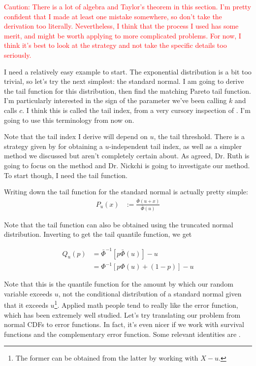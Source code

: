 \documentclass{article}
\begin{document}
\textcolor{red}{Caution: There is a lot of algebra and Taylor's theorem in this section. I'm pretty confident that I made at least one mistake somewhere, so don't take the derivation too literally. Nevertheless, I think that the process I used has some merit, and might be worth applying to more complicated problems. For now, I think it's best to look at the strategy and not take the specific details too seriously.}

I need a relatively easy example to start. The exponential distribution is a bit too trivial, so let's try the next simplest: the standard normal. I am going to derive the tail function for this distribution, then find the matching Pareto tail function. I'm particularly interested in the sign of the parameter we've been calling $k$ and \citeauthor{Pic75} calls $c$. I think this is called the tail index, from a very cursory inspection of \citet{deH06}. I'm going to use this terminology from now on.

Note that the tail index I derive will depend on $u$, the tail threshold. There is a strategy given by \citeauthor{Pic75} for obtaining a $u$-independent tail index, as well as a simpler method we discussed but aren't completely certain about. As agreed, Dr. Ruth is going to focus on the \citeauthor{Pic75} method and Dr. Nickchi is going to investigate our method. To start though, I need the tail function.

Writing down the tail function for the standard normal is actually pretty simple:
%
\begin{align}
    P_u(x) &:= \frac{\bar{\Phi}(u + x)}{\bar{\Phi}(u)}
\end{align}

Note that the tail function can also be obtained using the truncated normal distribution. Inverting to get the tail quantile function, we get

\begin{align}
    Q_u(p) &= \bar{\Phi}^{-1}[p \bar{\Phi}(u)] - u\\
    &= \Phi^{-1}[p \Phi(u) + (1-p)] - u
\end{align}

Note that this is the quantile function for the amount by which our random variable exceeds $u$, not the conditional distribution of a standard normal given that it exceeds $u$\footnote{The former can be obtained from the latter by working with $X-u$.}. Applied math people tend to really like the error function, which has been extremely well studied. Let's try translating our problem from normal CDFs to error functions. In fact, it's even nicer if we work with survival functions and the complementary error function. Some relevant identities are .
\end{document}
